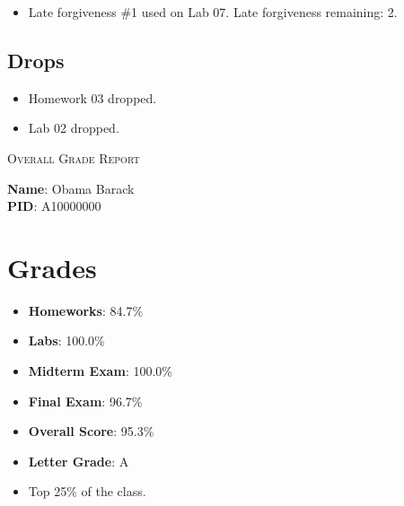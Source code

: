 \documentclass{article}
\begin{document}
\begin{itemize}


\item Late forgiveness \#1 used on Lab 07. Late forgiveness remaining: 2.


\end{itemize}


\subsection*{Drops}

\begin{itemize}


\item Homework 03 dropped.


\item Lab 02 dropped.


\end{itemize}
\newpage

\begin{center}
    \textsc{Overall Grade Report}
\end{center}
\vspace{4em}


\textbf{Name}: Obama Barack\\[2em]


\textbf{PID}: A10000000
\vspace{4em}

\section*{Grades}

\begin{itemize}


\item \textbf{Homeworks}: 84.7\%


\item \textbf{Labs}: 100.0\%


\item \textbf{Midterm Exam}: 100.0\%


\item \textbf{Final Exam}: 96.7\%


\end{itemize}

\begin{itemize}
    \item \textbf{Overall Score}: 95.3\%
    \item \textbf{Letter Grade}: A


\item Top 25\% of the class.


\end{itemize}
\end{document}
